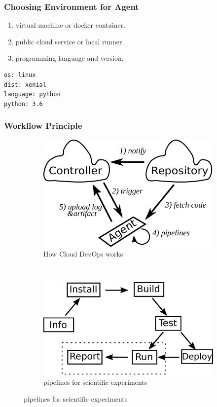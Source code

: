 \documentclass[notheorems]{beamer}
\begin{document}
\begin{frame}[fragile]
\frametitle{Choosing Environment for Agent}
\begin{enumerate}
\item virtual machine or docker container.
\item public cloud service or local runner.
\item programming language and version.
\end{enumerate}

\begin{lstlisting}[caption={environment configuration}, captionpos=b, xleftmargin=.3\textwidth]
os: linux
dist: xenial
language: python
python: 3.6
\end{lstlisting}
\end{frame}

\begin{frame}[fragile]
\frametitle{Workflow Principle}
\begin{figure}
\centering
\begin{subfigure}{0.4\textwidth}
\includegraphics[width=\textwidth]{../principal.pdf}
\caption{How Cloud DevOps works}
\end{subfigure}~
\begin{subfigure}{0.4\textwidth}
\includegraphics[width=\textwidth]{../workflow.pdf}
\caption{pipelines for scientific experiments}
\end{subfigure}
\end{figure}


\end{frame}
\end{document}
